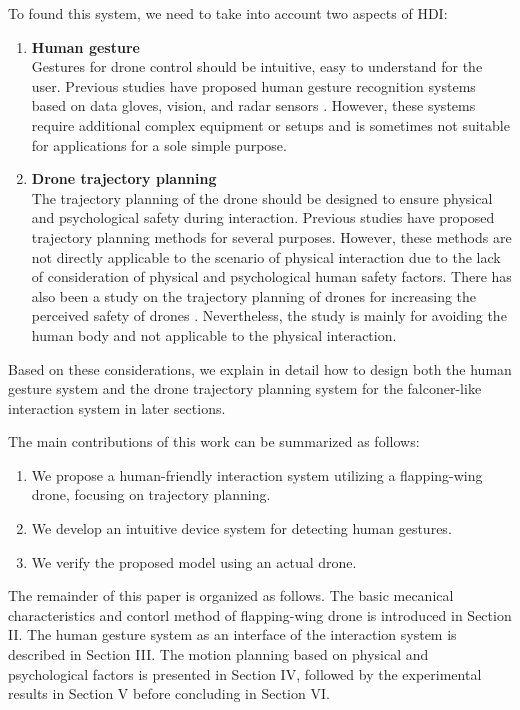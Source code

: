 To found this system, we need to take into account two aspects of HDI:
\begin{enumerate}
    \item \textbf{Human gesture}\\
    Gestures for drone control should be intuitive, easy to understand for the user.
    Previous studies have proposed human gesture recognition systems based on data gloves, vision, and radar sensors \cite{guo2021hand-gesture-recognition,ahmed2021hand}.
    However, these systems require additional complex equipment or setups and is sometimes not suitable for applications for a sole simple purpose.
    \item \textbf{Drone trajectory planning}\\
    The trajectory planning of the drone should be designed to ensure physical and psychological safety during interaction.
    Previous studies have proposed trajectory planning methods for several purposes\cite{sandino2021object-detection-uncertainty, rezaee2024drones-collision-avoidance}.
    However, these methods are not directly applicable to the scenario of physical interaction due to the lack of consideration of physical and psychological human safety factors.
    There has also been a study on the trajectory planning of drones for increasing the perceived safety of drones \cite{van2023perceived-safety}.
    Nevertheless, the study is mainly for avoiding the human body and not applicable to the physical interaction.
\end{enumerate}
Based on these considerations, we explain in detail how to design both the human gesture system and the drone trajectory planning system for the falconer-like interaction system in later sections.

The main contributions of this work can be summarized as
follows:
\begin{enumerate}
    \item We propose a human-friendly interaction system utilizing a flapping-wing drone, focusing on trajectory planning.
    \item We develop an intuitive device system for detecting human gestures.
    \item We verify the proposed model using an actual drone.
\end{enumerate}

The remainder of this paper is organized as follows. 
The basic mecanical characteristics and contorl method of flapping-wing drone is introduced in Section II. 
The human gesture system as an interface of the interaction system is described in Section III.
The motion planning based on physical and psychological factors is presented in Section IV,
followed by the experimental results in Section V before concluding in Section VI.